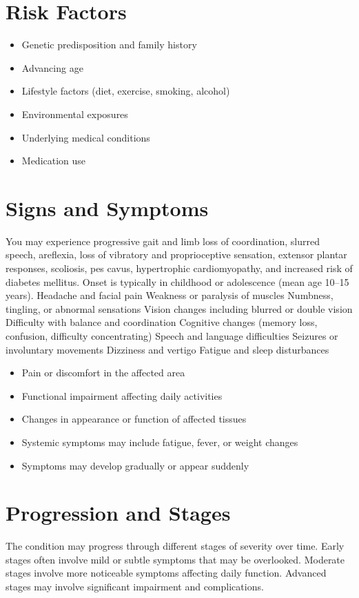 \section{Risk Factors}
\begin{itemize}[noitemsep]
  \item Genetic predisposition and family history
  \item Advancing age
  \item Lifestyle factors (diet, exercise, smoking, alcohol)
  \item Environmental exposures
  \item Underlying medical conditions
  \item Medication use
\end{itemize}
\section{Signs and Symptoms}
You may experience progressive gait and limb loss of coordination, slurred speech, areflexia, loss of vibratory and proprioceptive sensation, extensor plantar responses, scoliosis, pes cavus, hypertrophic cardiomyopathy, and increased risk of diabetes mellitus. Onset is typically in childhood or adolescence (mean age 10--15 years). Headache and facial pain Weakness or paralysis of muscles Numbness, tingling, or abnormal sensations Vision changes including blurred or double vision Difficulty with balance and coordination Cognitive changes (memory loss, confusion, difficulty concentrating) Speech and language difficulties Seizures or involuntary movements Dizziness and vertigo Fatigue and sleep disturbances

\begin{itemize}[noitemsep]
  \item Pain or discomfort in the affected area
  \item Functional impairment affecting daily activities
  \item Changes in appearance or function of affected tissues
  \item Systemic symptoms may include fatigue, fever, or weight changes
  \item Symptoms may develop gradually or appear suddenly
\end{itemize}
\section{Progression and Stages}
The condition may progress through different stages of severity over time. Early stages often involve mild or subtle symptoms that may be overlooked. Moderate stages involve more noticeable symptoms affecting daily function. Advanced stages may involve significant impairment and complications.

